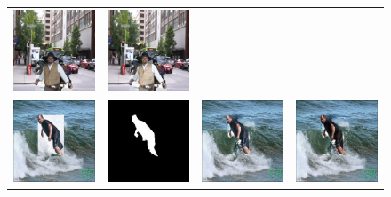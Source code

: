\begin{figure}[!ht]
\begin{tabular}{cccc}
  \includegraphics[width=.25\textwidth]{figures/guided/000000488251_inpainting.jpg}&
  \includegraphics[width=.25\textwidth]{figures/guided/000000488251_inpainting_harmonization.jpg} \\
  \includegraphics[width=.25\textwidth]{figures/gi/images/000000190007_input.jpg}&
\includegraphics[width=.25\textwidth]{figures/gi/images/000000190007_mask.jpg}&
\includegraphics[width=.25\textwidth]{figures/gi/images/000000190007_inpainting.jpg}&
\includegraphics[width=.25\textwidth]{figures/gi/images/000000190007_inpainting_harmonization.jpg}\\ 

\end{tabular}
\end{figure}
